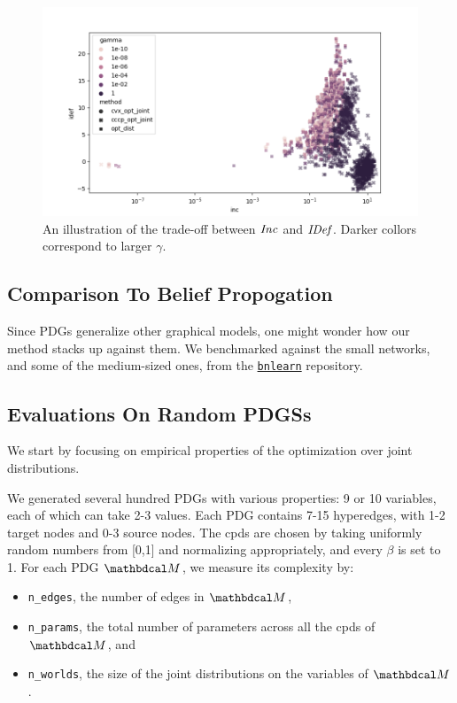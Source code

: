 \documentclass[twoside]{article}
\begin{document}
\begin{figure}
    \includegraphics[width=\linewidth]{figs/inc-idef2}
    \caption{An illustration of the trade-off between $\mathit{Inc}$ and $\mathit{IDef}_{\!}$. Darker collors correspond to larger $\gamma$.}\label{fig:inc-idef}
\end{figure}

\subsection{Comparison To Belief Propogation}

Since PDGs generalize other graphical models, one might wonder how our method stacks up against them. 
We benchmarked against the small networks, and some of the medium-sized ones, from the \href{https://www.bnlearn.com/bnrepository/}{\texttt{bnlearn}} repository. 



\subsection{Evaluations On Random PDGSs}
We start by focusing on empirical properties of the optimization over joint distributions.

We generated several hundred PDGs with various properties: 9 or 10
variables, each of which can take 2-3 values. Each PDG contains 7-15
hyperedges, with 1-2 target nodes and 0-3 source nodes. The cpds are
chosen by taking uniformly random numbers from [0,1] and normalizing
appropriately, and every $\beta$ is set to 1. 
For each PDG $\dg M$, we measure its complexity by:
\begin{itemize}[nosep]
    \item \texttt{n\_edges}, the number of edges in $\dg M$,
    \item \texttt{n\_params}, the total number of parameters across all the cpds of $\dg M$, and
    \item \texttt{n\_worlds}, the size of the joint distributions on the variables of $\dg M$.
\end{itemize}
\end{document}
